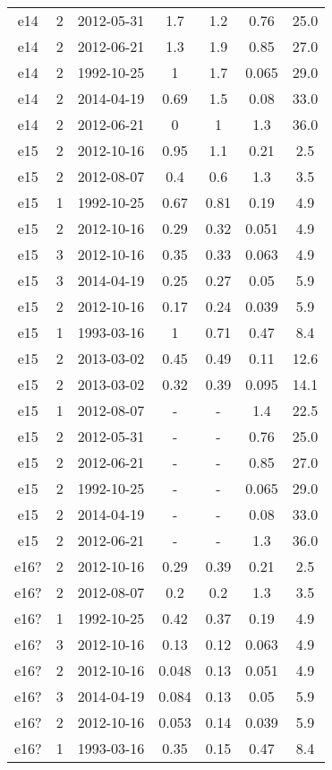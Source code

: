 \begin{table*}[htp]
\begin{tabular}{ccccccc}
e14 & 2 & 2012-05-31 & 1.7 & 1.2 & 0.76 & 25.0 \\
e14 & 2 & 2012-06-21 & 1.3 & 1.9 & 0.85 & 27.0 \\
e14 & 2 & 1992-10-25 & 1 & 1.7 & 0.065 & 29.0 \\
e14 & 2 & 2014-04-19 & 0.69 & 1.5 & 0.08 & 33.0 \\
e14 & 2 & 2012-06-21 & 0 & 1 & 1.3 & 36.0 \\
e15 & 2 & 2012-10-16 & 0.95 & 1.1 & 0.21 & 2.5 \\
e15 & 2 & 2012-08-07 & 0.4 & 0.6 & 1.3 & 3.5 \\
e15 & 1 & 1992-10-25 & 0.67 & 0.81 & 0.19 & 4.9 \\
e15 & 2 & 2012-10-16 & 0.29 & 0.32 & 0.051 & 4.9 \\
e15 & 3 & 2012-10-16 & 0.35 & 0.33 & 0.063 & 4.9 \\
e15 & 3 & 2014-04-19 & 0.25 & 0.27 & 0.05 & 5.9 \\
e15 & 2 & 2012-10-16 & 0.17 & 0.24 & 0.039 & 5.9 \\
e15 & 1 & 1993-03-16 & 1 & 0.71 & 0.47 & 8.4 \\
e15 & 2 & 2013-03-02 & 0.45 & 0.49 & 0.11 & 12.6 \\
e15 & 2 & 2013-03-02 & 0.32 & 0.39 & 0.095 & 14.1 \\
e15 & 1 & 2012-08-07 & - & - & 1.4 & 22.5 \\
e15 & 2 & 2012-05-31 & - & - & 0.76 & 25.0 \\
e15 & 2 & 2012-06-21 & - & - & 0.85 & 27.0 \\
e15 & 2 & 1992-10-25 & - & - & 0.065 & 29.0 \\
e15 & 2 & 2014-04-19 & - & - & 0.08 & 33.0 \\
e15 & 2 & 2012-06-21 & - & - & 1.3 & 36.0 \\
e16? & 2 & 2012-10-16 & 0.29 & 0.39 & 0.21 & 2.5 \\
e16? & 2 & 2012-08-07 & 0.2 & 0.2 & 1.3 & 3.5 \\
e16? & 1 & 1992-10-25 & 0.42 & 0.37 & 0.19 & 4.9 \\
e16? & 3 & 2012-10-16 & 0.13 & 0.12 & 0.063 & 4.9 \\
e16? & 2 & 2012-10-16 & 0.048 & 0.13 & 0.051 & 4.9 \\
e16? & 3 & 2014-04-19 & 0.084 & 0.13 & 0.05 & 5.9 \\
e16? & 2 & 2012-10-16 & 0.053 & 0.14 & 0.039 & 5.9 \\
e16? & 1 & 1993-03-16 & 0.35 & 0.15 & 0.47 & 8.4 \\

\end{tabular}
\end{table*}
